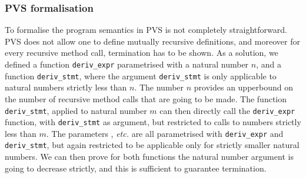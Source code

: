 \subsubsection{PVS formalisation}
To formalise the program semantics in PVS is not completely
straightforward. PVS does not allow one to define mutually recursive
definitions, and moreover for every recursive method call, termination
has to be shown. As a solution, we defined a function
\texttt{deriv\_expr} parametrised with a
natural number \(n\), and a function \texttt{deriv\_stmt}, where the
argument \texttt{deriv\_stmt} is only applicable to natural numbers
strictly less than \(n\). The number \(n\) provides an upperbound on
the number of recursive method calls that are going to be made.  The
function \texttt{deriv\_stmt}, applied to natural number \(m\) can
then directly call the \texttt{deriv\_expr} function, with
\texttt{deriv\_stmt} as argument, but restricted to calls to numbers
strictly less than \(m\). 
The parameters \gammain, \gammanorm \emph{etc.} are all parametrised
with \texttt{deriv\_expr} and \texttt{deriv\_stmt}, but again
restricted to be applicable only for strictly smaller natural
numbers. We can then prove for both functions the natural number
argument is going to decrease strictly, and this is sufficient to
guarantee termination.







